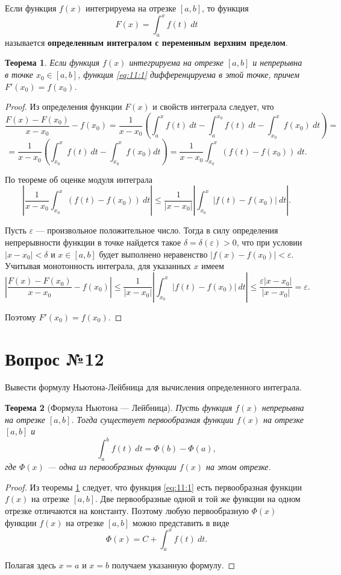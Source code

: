 \documentclass[12pt]{report}
\numberwithin{equation}{section}
\newtheorem{theorem}{Теорема}[section]
\begin{document}
Если функция $f(x)$ интегрируема на отрезке $[a,b]$, то функция
\begin{equation} \label{eq:11:1} 
F(x) = \int_a^x f(t)~dt
\end{equation}
называется \textbf{определенным интегралом с переменным верхним пределом}.
\begin{theorem}  \label{th:11:1}
 Если функция $f(x)$ интегрируема на отрезке $[a, b]$ и непрерывна в точке $x_0 \in [a,b]$, функция \ref{eq:11:1} дифференцируема в этой точке, причем $F'(x_0) = f(x_0)$.
\end{theorem}
\begin{proof}Из  определения функции $F(x)$ и свойств интеграла следует, что
\[ \frac{F(x)- F(x_0)}{x - x_0} - f(x_0) = \frac{1}{x - x_0} \left( \int_a^x f(t) ~dt - \int_a^{x_0} f(t) ~dt - \int_{x_0}^x f(x_0)~dt \right) =\]
\[ = \frac{1}{x-x_0} \left( \int_{x_0}^x f(t)~dt - \int_{x_0}^x f(x_0) dt \right) = \frac{1}{x-x_0} \int_{x_0}^x (f(t) - f(x_0))~dt.\]

По теореме об оценке модуля интеграла
\[ \left| \frac{1}{x-x_0} \int_{x_0}^x (f(t) - f(x_0))~dt \right| \leqslant \frac{1}{|x-x_0|} \left| \int_{x_0}^x |f(t) - f(x_0)| ~dt \right|.\]

Пусть $\varepsilon$ ---  произвольное положительное число. Тогда в силу определения непрерывности функции в точке найдется такое $\delta = \delta(\varepsilon) > 0$, что при условии $|x - x_0| < \delta$ и $x \in [a,b]$ будет выполнено неравенство $|f(x) - f(x_0)| < \varepsilon$. Учитывая монотонность интеграла, для указанных $x$ имеем
\[ \left| \frac{F(x) - F(x_0)}{x - x_0} - f(x_0) \right| \leqslant \frac{1}{|x - x_0|} \left| \int_{x_0}^x |f(t) - f(x_0)| ~dt\right| \leqslant \frac{\varepsilon|x-x_0|}{|x-x_0|} = \varepsilon.\]

Поэтому $F'(x_0) = f(x_0)$.
\end{proof}

\newpage \section{Вопрос №12} %
\begin{framed}
Вывести формулу Ньютона-Лейбница для вычисления определенного интеграла.
\end{framed}
\begin{theorem} [Формула Ньютона --- Лейбница]\label{th:12:1}
Пусть функция $f(x)$ непрерывна на отрезке $[a,b]$. Тогда существует первообразная функции $f(x)$ на отрезке $[a,b]$ и
\[ \int_a^b f(t)~dt = \Phi(b) - \Phi(a), \]
где $\Phi(x)$ --- одна из первообразных функции $f(x)$ на этом отрезке.
\end{theorem}
\begin{proof}
Из теоремы \ref{th:11:1} следует, что функция \ref{eq:11:1} есть первообразная функции $f(x)$ на отрезке $[a,b]$. Две первообразные одной и той же функции на одном отрезке отличаются на константу. Поэтому любую первообразную $\Phi(x)$ функции $f(x)$ на отрезке $[a,b]$ можно представить в виде
\[ \Phi(x) = C + \int_a^x f(t)~dt. \]

Полагая здесь $x = a$ и $x = b$ получаем указанную формулу.
\end{proof}
\end{document}
